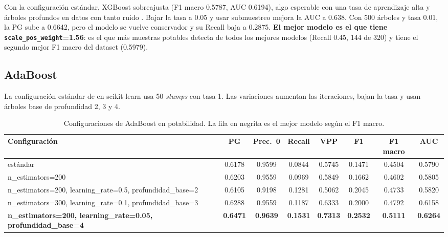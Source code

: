 \documentclass[11pt,a4paper]{article}
\let\citepOriginal\citep
\renewcommand*{\citep}[1]{\textbf{\citepOriginal{#1}}}%
\let\citetOriginal\citet
\renewcommand*{\citet}[1]{\textbf{\citetOriginal{#1}}}%
\begin{document}
Con la configuración estándar, XGBoost sobreajusta (F1 macro 0.5787, AUC 0.6194), algo esperable con una tasa de aprendizaje alta y árboles profundos en datos con tanto ruido \citep{friedman2001}. Bajar la tasa a 0.05 y usar submuestreo mejora la AUC a 0.638. Con 500 árboles y tasa 0.01, la PG sube a 0.6642, pero el modelo se vuelve conservador y su Recall baja a 0.2875. \textbf{El mejor modelo es el que tiene \texttt{scale\_pos\_weight}=1.56}: es el que más muestras potables detecta de todos los mejores modelos (Recall 0.45, 144 de 320) y tiene el segundo mejor F1 macro del dataset (0.5979).

\subsection{AdaBoost}
La configuración estándar de \citet{freund1997} en scikit-learn usa 50 \textit{stumps} con tasa 1. Las variaciones aumentan las iteraciones, bajan la tasa y usan árboles base de profundidad 2, 3 y 4.

\begin{table}[H]
\centering
\small
\caption{Configuraciones de AdaBoost en potabilidad. La fila en negrita es el mejor modelo según el F1 macro.}
\setlength{\tabcolsep}{4pt}
\begin{tabular}{>{\raggedright\arraybackslash}p{4.9cm}ccccccc}
\toprule
Configuración & PG & Prec.\ 0 & Recall & VPP & F1 & F1 macro & AUC \\
\midrule
estándar & 0.6178 & 0.9599 & 0.0844 & 0.5745 & 0.1471 & 0.4504 & 0.5790 \\
n\_estimators=\allowbreak{}200 & 0.6203 & 0.9559 & 0.0969 & 0.5849 & 0.1662 & 0.4602 & 0.5805 \\
n\_estimators=\allowbreak{}200, \allowbreak learning\_rate=\allowbreak{}0.5, \allowbreak profundidad\_base=\allowbreak{}2 & 0.6105 & 0.9198 & 0.1281 & 0.5062 & 0.2045 & 0.4733 & 0.5820 \\
n\_estimators=\allowbreak{}300, \allowbreak learning\_rate=\allowbreak{}0.1, \allowbreak profundidad\_base=\allowbreak{}3 & 0.6288 & 0.9559 & 0.1187 & 0.6333 & 0.2000 & 0.4792 & 0.6158 \\
\textbf{n\_estimators=\allowbreak{}200, \allowbreak learning\_rate=\allowbreak{}0.05, \allowbreak profundidad\_base=\allowbreak{}4} & \textbf{0.6471} & \textbf{0.9639} & \textbf{0.1531} & \textbf{0.7313} & \textbf{0.2532} & \textbf{0.5111} & \textbf{0.6264} \\
\bottomrule
\end{tabular}
\end{table}
\end{document}
